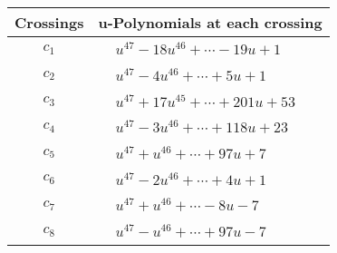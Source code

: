 \documentclass[1p]{elsarticle_modified}
\theoremstyle{definition}
\begin{document}
\begin{tabular}{m{50pt}|m{274pt}}
Crossings & \hspace{64pt}u-Polynomials at each crossing \\
\hline $$\begin{aligned}c_{1}\end{aligned}$$&$\begin{aligned}
&u^{47}-18 u^{46}+\cdots-19 u+1
\end{aligned}$\\
\hline $$\begin{aligned}c_{2}\end{aligned}$$&$\begin{aligned}
&u^{47}-4 u^{46}+\cdots+5 u+1
\end{aligned}$\\
\hline $$\begin{aligned}c_{3}\end{aligned}$$&$\begin{aligned}
&u^{47}+17 u^{45}+\cdots+201 u+53
\end{aligned}$\\
\hline $$\begin{aligned}c_{4}\end{aligned}$$&$\begin{aligned}
&u^{47}-3 u^{46}+\cdots+118 u+23
\end{aligned}$\\
\hline $$\begin{aligned}c_{5}\end{aligned}$$&$\begin{aligned}
&u^{47}+u^{46}+\cdots+97 u+7
\end{aligned}$\\
\hline $$\begin{aligned}c_{6}\end{aligned}$$&$\begin{aligned}
&u^{47}-2 u^{46}+\cdots+4 u+1
\end{aligned}$\\
\hline $$\begin{aligned}c_{7}\end{aligned}$$&$\begin{aligned}
&u^{47}+u^{46}+\cdots-8 u-7
\end{aligned}$\\
\hline $$\begin{aligned}c_{8}\end{aligned}$$&$\begin{aligned}
&u^{47}- u^{46}+\cdots+97 u-7
\end{aligned}$\\

\end{tabular}
\end{document}
